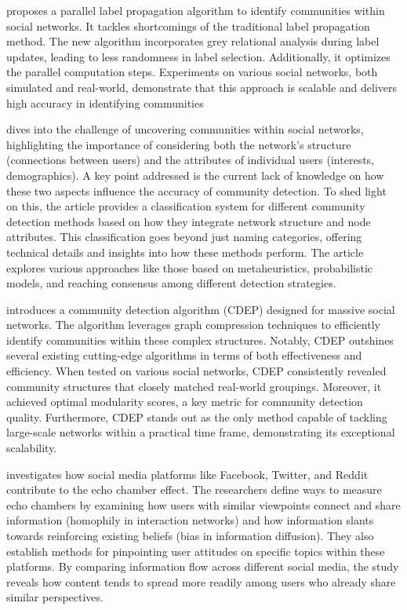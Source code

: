 \documentclass[12pt]{article}
\begin{document}
\cite{ZHANG2016133} proposes a parallel label propagation algorithm to identify communities within social networks.
It tackles shortcomings of the traditional label propagation method.
The new algorithm incorporates grey relational analysis during label updates, leading to less randomness in label selection.
Additionally, it optimizes the parallel computation steps. Experiments on various social networks, both simulated and real-world, demonstrate
that this approach is scalable and delivers high accuracy in identifying communities

\cite{Chunaev_2020} dives into the challenge of uncovering communities within social networks, highlighting the importance of considering both
the network's structure (connections between users) and the attributes of individual users (interests, demographics).  A key point
addressed is the current lack of knowledge on how these two aspects influence the accuracy of community detection.
To shed light on this, the article provides a classification system for different community detection methods based on how they
integrate network structure and node attributes. This classification goes beyond just naming categories, offering technical details and
insights into how these methods perform. The article explores various approaches like those based on metaheuristics, probabilistic models,
and reaching consensus among different detection strategies.

\cite{ZHAO2021358} introduces a community detection algorithm (CDEP) designed for massive social networks.
The algorithm leverages graph compression techniques to efficiently identify communities within these complex structures.
Notably, CDEP outshines several existing cutting-edge algorithms in terms of both effectiveness and efficiency.
When tested on various social networks, CDEP consistently revealed community structures that
closely matched real-world groupings. Moreover, it achieved optimal modularity scores, a key metric for
community detection quality.  Furthermore, CDEP stands out as the only method capable of tackling large-scale
networks within a practical time frame, demonstrating its exceptional scalability.

\cite{Cinelli_2021} investigates how social media platforms like Facebook, Twitter, and Reddit contribute to the echo chamber effect.
The researchers define ways to measure echo chambers by examining how users with similar viewpoints connect and share information
(homophily in interaction networks) and how information slants towards reinforcing existing beliefs (bias in information diffusion).
They also establish methods for pinpointing user attitudes on specific topics within these platforms.
By comparing information flow across different social media, the study reveals how content
tends to spread more readily among users who already share similar perspectives.
\end{document}
